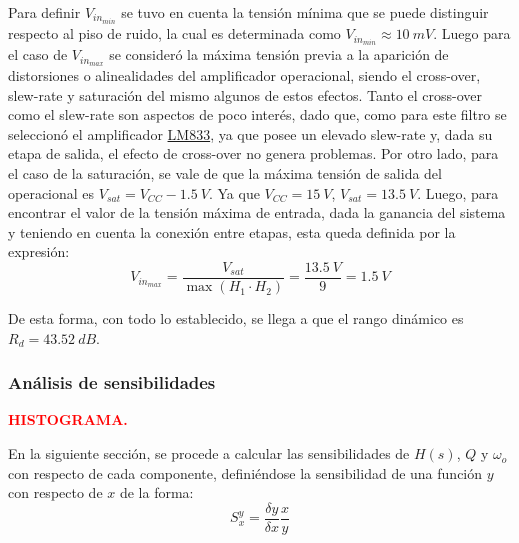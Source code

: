 Para definir $V_{in_{min}}$ se tuvo en cuenta la tensión mínima que se puede distinguir respecto al piso de ruido, la cual es determinada como $V_{in_{min}} \approx 10 \ mV$. Luego para el caso de $V_{in_{max}}$ se consideró la máxima tensión previa a la aparición de distorsiones o alinealidades del amplificador operacional, siendo el cross-over, slew-rate y saturación del mismo algunos de estos efectos. Tanto el cross-over como el slew-rate son aspectos de poco interés, dado que, como para este filtro se seleccionó el amplificador \href{http://www.ti.com/lit/ds/symlink/lm833-n.pdf}{LM833}, ya que posee un elevado slew-rate y, dada su etapa de salida, el efecto de cross-over no genera problemas. Por otro lado, para el caso de la saturación, se vale de que la máxima tensión de salida del operacional es $V_{sat} = V_{CC} - 1.5 \ V$. Ya que $V_{CC} = 15 \ V$, $V_{sat} = 13.5 \ V$. Luego, para encontrar el valor de la tensión máxima de entrada, dada la ganancia del sistema y teniendo en cuenta la conexión entre etapas, esta queda definida por la expresión:
\begin{equation}
	V_{in_{max}}=\frac{V_{sat}}{  \max(H_{1} \cdot H_{2} )} = \frac{13.5 \ V}{9} = 1.5 \ V
\end{equation}

De esta forma, con todo lo establecido, se llega a que el rango dinámico es $R_d = 43.52 \ dB$.

\subsubsection{Análisis de sensibilidades}
\begin{center}
	\Large{\textbf{\textcolor{red}{HISTOGRAMA.}}}
\end{center}

En la siguiente sección, se procede a calcular las sensibilidades de $H(s)$, $Q$ y $\omega_o$ con respecto de cada componente, definiéndose la sensibilidad de una función $y$ con respecto de $x$ de la forma:
\begin{equation*}
	S_{x}^{y} = \frac{\delta y}{\delta x} \frac{x}{y}
\end{equation*}

